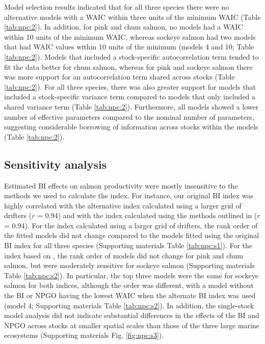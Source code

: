 Model selection results indicated that for all three species there were no
alternative models with a WAIC within three units of the minimum WAIC (Table
\ref{tab:npc:2}). In addition, for pink and chum salmon, no models had a WAIC
within 10 units of the minimum WAIC, whereas sockeye salmon had two models that
had WAIC values within 10 units of the minimum (models 4 and 10; Table
\ref{tab:npc:2}). Models that included a stock-specific autocorrelation term
tended to fit the data better for chum salmon, whereas for pink and sockeye
salmon there was more support for an autocorrelation term shared across stocks
(Table \ref{tab:npc:2}). For all three species, there was also greater support
for models that included a stock-specific variance term compared to models that
only included a shared variance term (Table \ref{tab:npc:2}). Furthermore, all
models showed a lower number of effective parameters compared to the nominal
number of parameters, suggesting considerable borrowing of information across
stocks within the models (Table \ref{tab:npc:2}).


\subsection{Sensitivity analysis}

Estimated BI effects on salmon productivity were mostly insensitive to the
methods we used to calculate the index. For instance, our original BI index was
highly correlated with the alternative index calculated using a larger grid of
drifters (\(r\) = 0.94) and with the index calculated using the methods outlined
in \citet{Watters2008a} (\(r\) = 0.94). For the index calculated using a larger
grid of drifters, the rank order of the fitted models did not change compared to
the models fitted using the original BI index for all three species
(Supporting materials Table \ref{tab:npc:s1}). For the index based on
\citet{Watters2008a}, the rank order of models did not change for pink and chum
salmon, but were moderately sensitive for sockeye salmon (Supporting materials
Table \ref{tab:npc:s2}). In particular, the top three models were the same for
sockeye salmon for both indices, although the order was different, with a model
without the BI or NPGO having the lowest WAIC when the alternate
\citet{Watters2008a} BI index was used (model 4; Supporting materials Table
\ref{tab:npc:s2}). In addition, the single-stock model analysis did not indicate
substantial differences in the effects of the BI and NPGO across stocks at
smaller spatial scales than those of the three large marine ecosystems
(Supporting materials Fig. \ref{fig:npc:s3}).



